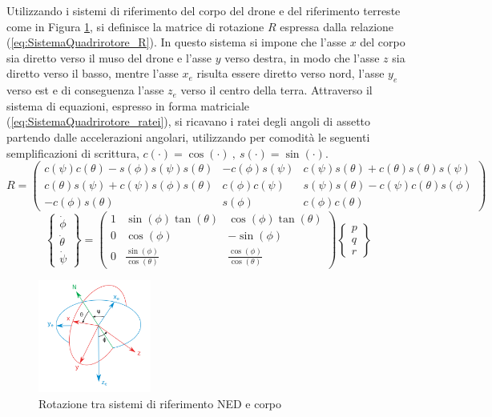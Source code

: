 Utilizzando i sistemi di riferimento del corpo del drone e del riferimento terreste come in Figura \ref{fig:riferimenti}, si definisce la matrice di rotazione $R$ espressa dalla relazione (\ref{eq:SistemaQuadrirotore_R}). In questo sistema si impone che l'asse $x$ del corpo sia diretto verso il muso del drone e l'asse $y$ verso destra, in modo che l'asse $z$ sia diretto verso il basso, mentre l'asse $x_e$ risulta essere diretto verso nord, l'asse $y_e$ verso est e di conseguenza l'asse $z_e$ verso il centro della terra. 
Attraverso il sistema di equazioni, espresso in forma matriciale (\ref{eq:SistemaQuadrirotore_ratei}), si ricavano i ratei degli angoli di assetto partendo dalle accelerazioni angolari, utilizzando per  comodità le seguenti semplificazioni di scrittura, $ c(\cdot)=\cos(\cdot)\ ,\  s(\cdot) = \sin(\cdot) $.
\begin{equation}
R=
	\begin{pmatrix}
	c(\psi)c(\theta)-s(\phi)s(\psi)s(\theta) & -c(\phi)s(\psi) & c(\psi)s(\theta)+c(\theta)s(\theta)s(\psi) \\ 
	c(\theta) s(\psi)+c(\psi)s(\phi)s(\theta) & c(\phi)c(\psi) & s(\psi)s(\theta)-c(\psi)c(\theta)s(\phi) \\ 
	-c(\phi)s(\theta)	& s(\phi) & c(\phi)c(\theta)
	\end{pmatrix}
	\label{eq:SistemaQuadrirotore_R}
\end{equation}
\begin{equation}
	\begin{Bmatrix}
		\dot{\phi}\\
		\dot{\theta}\\
		\dot{\psi}
		\end{Bmatrix}=
	\begin{pmatrix}
		1 & \sin(\phi)\tan(\theta) & \cos(\phi)\tan(\theta) \\ 
		0 & \cos(\phi) & -\sin(\phi) \\ 
		0 & \frac{\sin(\phi)}{\cos(\theta)} & \frac{\cos(\phi)}{\cos(\theta)}
	\end{pmatrix}
	\begin{Bmatrix}
		p\\
		q\\
		r
	\end{Bmatrix}
	\label{eq:SistemaQuadrirotore_ratei}
\end{equation}

\begin{figure}
	\centering
	\includegraphics[width=0.33\textwidth]{SistemaQuadrirotore/Figure/eulerangles.png}
	\caption{Rotazione tra sistemi di riferimento NED e corpo \cite{eulero}}
	\label{fig:riferimenti}
\end{figure}

